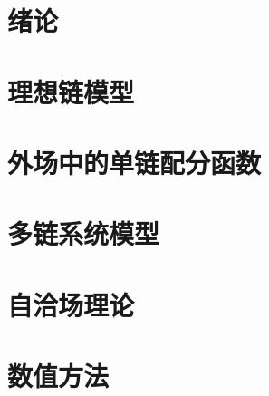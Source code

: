

\chapter{绪论}


\chapter{理想链模型}


\chapter{外场中的单链配分函数}


\chapter{多链系统模型}


\chapter{自洽场理论}


\chapter{数值方法}

